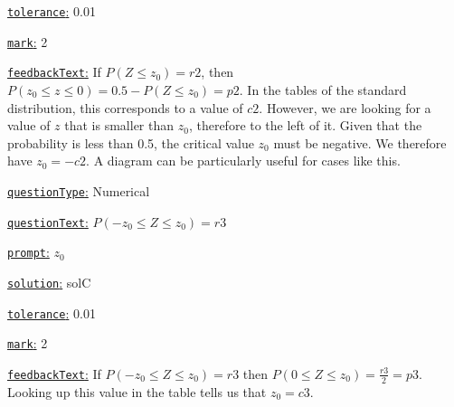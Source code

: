 \documentclass[preview]{standalone}
\newcommand \fieldname[1]{\underline{\texttt{#1}:}}
\begin{document}
\fieldname{tolerance}
0.01

\fieldname{mark}
2

\fieldname{feedbackText}
If $P(Z \le z_0) = {r2}$, then $P(z_0 \le z \le 0) = 0.5 - P(Z \le z_0) = {p2}$. In the tables of the standard distribution, this corresponds to a value of ${c2}$. However, we are looking for a value of $z$ that is smaller than $z_0$, therefore to the left of it. Given that the probability is less than 0.5, the critical value $z_0$ must be negative. We therefore have $z_0 = -{c2}$. A diagram can be particularly useful for cases like this.

\fieldname{questionType}
Numerical

\fieldname{questionText}
$P(-z_0 \le Z \le z_0) = {r3}$

\fieldname{prompt}
$z_0$

\fieldname{solution}
solC

\fieldname{tolerance}
0.01

\fieldname{mark}
2

\fieldname{feedbackText}
If $P(-z_0 \le Z \le z_0) = {r3}$ then $P(0 \le Z \le z_0) = \frac{{r3}}{2} = {p3}$. Looking up this value in the table tells us that $z_0 = {c3}$.

\end{document}
